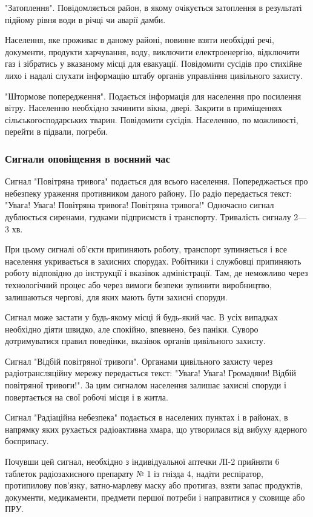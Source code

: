 "Затоплення". Повідомляється район, в якому очікується затоплення в результаті підйому рівня води в річці чи аварії дамби.

Населення, яке проживає в даному районі, повинне взяти необхідні речі, документи, продукти харчування, воду, виключити електроенергію, відключити газ і зібратись у вказаному місці для евакуації. Повідомити сусідів про стихійне лихо і надалі слухати інформацію штабу органів управління цивільного захисту.

"Штормове попередження". Подається інформація для населення про посилення вітру. Населенню необхідно зачинити вікна, двері. Закрити в приміщеннях сільськогосподарських тварин. Повідомити сусідів. Населенню, по можливості, перейти в підвали, погреби.

\subsubsection{Сигнали оповіщення в воєнний час}

Сигнал "Повітряна тривога" подається для всього населення. Попереджається про небезпеку ураження противником даного району. По радіо передається текст: "Увага! Увага! Повітряна тривога! Повітряна тривога!" Одночасно сигнал дублюється сиренами, гудками підприємств і транспорту. Тривалість сигналу 2—3 хв.

При цьому сигналі об'єкти припиняють роботу, транспорт зупиняється і все населення укривається в захисних спорудах. Робітники і службовці припиняють роботу відповідно до інструкції і вказівок адміністрації. Там, де неможливо через технологічний процес або через вимоги безпеки зупинити виробництво, залишаються чергові, для яких мають бути захисні споруди.

Сигнал може застати у будь-якому місці й будь-який час. В усіх випадках необхідно діяти швидко, але спокійно, впевнено, без паніки. Суворо дотримуватися правил поведінки, вказівок органів цивільного захисту.

Сигнал "Відбій повітряної тривоги". Органами цивільного захисту через радіотрансляційну мережу передається текст: "Увага! Увага! Громадяни! Відбій повітряної тривоги!". За цим сигналом населення залишає захисні споруди і повертається на свої робочі місця і в житла.

Сигнал "Радіаційна небезпека" подається в населених пунктах і в районах, в напрямку яких рухається радіоактивна хмара, що утворилася від вибуху ядерного боєприпасу.

Почувши цей сигнал, необхідно з індивідуальної аптечки ЛІ-2 прийняти 6 таблеток радіозахисного препарату № 1 із гнізда 4, надіти респіратор, протипилову пов'язку, ватно-марлеву маску або протигаз, взяти запас продуктів, документи, медикаменти, предмети першої потреби і направитися у сховище або ПРУ.

